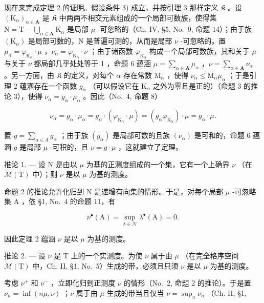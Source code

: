 现在来完成定理 2 的证明。假设条件 3) 成立，并按引理 3 那样定义 \(\mathfrak{K}\) 。设 \((\mathrm{K}_{\alpha})_{\alpha \in \mathbf{A}}\) 是 \(\mathfrak{K}\) 中两两不相交元素组成的一个局部可数族，使得集 \(\mathrm{N} = \mathrm{T} - \bigcup_{\alpha \in \mathbf{A}} \mathrm{K}_{\alpha}\) 是局部 \(\mu\) -可忽略的（Ch. IV, §5, No.~9, 命题 14）；由于族 \((\mathrm{K}_{\alpha})\) 是局部可数的，N 是普遍可测的，从而是局部 \(\nu\) -可忽略的。置 \(\mu_{\alpha} = \varphi_{\mathrm{K}_{\alpha}} \cdot \mu\) ，\(\nu_{\alpha} = \varphi_{\mathrm{K}_{\alpha}} \cdot \nu\) ；由于诸函数 \(\varphi_{\mathrm{K}_{\alpha}}\) 构成一个局部可数族，其和关于 \(\mu\) 与关于 \(\nu\) 都局部几乎处处等于 1 ，命题 6 蕴涵 \(\mu = \sum_{\alpha \in \mathbf{A}} \mu_{\alpha}\) ，\(\nu = \sum_{\alpha \in \mathbf{A}} \nu_{\alpha}\) 。另一方面，由 \(\mathfrak{K}\) 的定义，对每个 \(\alpha\) 存在常数 \(\mathrm{M}_{\alpha}\) ，使得 \(\nu_{\alpha} \leqslant \mathrm{M}_{\alpha} \mu_{\alpha}\) ；于是引理 2 蕴涵存在一个函数 \(g_{\alpha}\) （可以假设它在 \(\mathrm{K}_{\alpha}\) 之外为零且是正的）（命题 3 的推论 3），使得 \(\nu_{\alpha} = g_{\alpha} \cdot \mu_{\alpha}\) 。因此（No.~4, 命题 8）

\[
\nu_ {\alpha} = g _ {\alpha} \cdot \mu_ {\alpha} = g _ {\alpha} \cdot (\varphi_ {\mathrm{K} _ {\alpha}} \cdot \mu) = (g _ {\alpha} \varphi_ {\mathrm{K} _ {\alpha}}) \cdot \mu = g _ {\alpha} \cdot \mu .
\]

置 \(g = \sum_{\alpha \in A} g_{\alpha}\) ；由于族 \((g_{\alpha})\) 是局部可数的且族 \((\nu_{\alpha})\) 是可和的，命题 6 蕴涵 \(g\) 是局部 \(\mu\) -可积的，且 \(\nu = g \cdot \mu\) ，这就建立了定理。

推论 1. --- 设 N 是由以 \(\mu\) 为基的正测度组成的一个集，它有一个上确界 \(\nu\) （在 \(\mathcal{M}(\mathrm{T})\) 中）；则 \(\nu\) 是以 \(\mu\) 为基的测度。

命题 2 的推论允许化归到 N 是递增有向集的情形。于是，对每个局部 \(\mu\) -可忽略集 A ，依 §1, No.~4 的命题 11，有

\[
\nu^ {\bullet} (\mathrm{A}) = \sup _ {\lambda \in \mathcal {N}} \lambda^ {\bullet} (\mathrm{A}) = 0.
\]

因此定理 2 蕴涵 \(\nu\) 是以 \(\mu\) 为基的测度。

推论 2. --- 设 \(\nu\) 是 T 上的一个实测度。为使 \(\nu\) 属于由 \(\mu\) （在完全格序空间 \(\mathcal{M}(\mathrm{T})\) 中，Ch. II, §1, No.~5）生成的带，必须且只须 \(\nu\) 是以 \(\mu\) 为基的测度。

考虑 \(\nu^{+}\) 和 \(\nu^{-}\) ，立即化归到正测度 \(\nu\) 的情形（No.~2, 命题 2 的推论）。于是置 \(\nu_{n} = \inf(n\mu, \nu)\) ；\(\nu\) 属于由 \(\mu\) 生成的带当且仅当 \(\nu = \sup_{n} \nu_{n}\) （Ch. II, §1,

